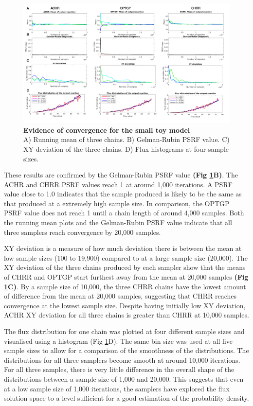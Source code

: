 \documentclass[10pt,letterpaper]{article}
\begin{document}
\begin{figure}
\begin{adjustwidth}{-2.25in}{0in}
\includegraphics[scale=0.45]{fig3.png}
\caption{\textbf{Evidence of convergence for the small toy model}\\
A) Running mean of three chains. B) Gelman-Rubin PSRF value. C) XY deviation of the three chains. D) Flux histograms at four sample sizes. 
}
\label{figure:3}
\end{adjustwidth}
\end{figure}

These results are confirmed by the Gelman-Rubin PSRF value \textbf{(Fig \ref{figure:3}B)}. The ACHR and CHRR PSRF values reach 1 at around 1,000 iterations. A PSRF value close to 1.0 indicates that the sample produced is likely to be the same as that produced at a extremely high sample size. In comparison, the OPTGP PSRF value does not reach 1 until a chain length of around 4,000 samples. Both the running mean plots and the Gelman-Rubin PSRF value indicate that all three samplers reach convergence by 20,000 samples.

XY deviation is a measure of how much deviation there is between the mean at low sample sizes (100 to 19,900) compared to at a large sample size (20,000). The XY deviation of the three chains produced by each sampler show that the means of CHRR and OPTGP start furthest away from the mean at 20,000 samples \textbf{(Fig \ref{figure:3}C)}. By a sample size of 10,000, the three CHRR chains have the lowest amount of difference from the mean at 20,000 samples, suggesting that CHRR reaches convergence at the lowest sample size. Despite having initially low XY deviation, ACHR XY deviation for all three chains is greater than CHRR at 10,000 samples.

The flux distribution for one chain was plotted at four different sample sizes and visualised using a histogram (Fig \ref{figure:3}D). The same bin size was used at all five sample sizes to allow for a comparison of the smoothness of the distributions. The distributions for all three samplers become smooth at around 10,000 iterations. For all three samples, there is very little difference in the overall shape of the distributions between a sample size of 1,000 and 20,000. This suggests that even at a low sample size of 1,000 iterations, the samplers have explored the flux solution space to a level sufficient for a good estimation of the probability density.
\end{document}

